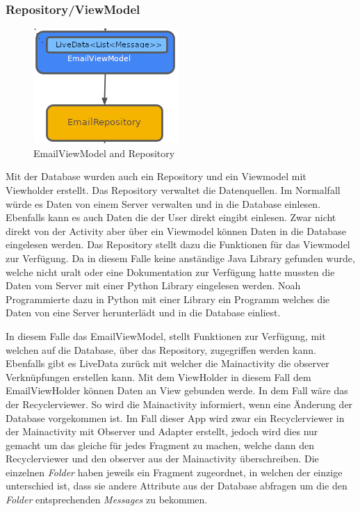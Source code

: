 \documentclass[a4paper,11pt]{article}
\begin{document}
\subsubsection{Repository/ViewModel}

\begingroup
\setlength{\intextsep}{1pt}
\setlength{\columnsep}{4pt}

\begin{figure}
    \centering
    \includegraphics[width=.4\textwidth]{media/ViewModelRepository.png}
    \caption{EmailViewModel and Repository
    \cite{appStructurePicture}}
\end{figure}

Mit der Database wurden auch ein Repository und ein Viewmodel mit Viewholder erstellt. 
Das Repository verwaltet die Datenquellen. Im Normalfall würde es Daten von einem Server verwalten und in die Database einlesen. Ebenfalls kann
es auch Daten die der User direkt eingibt einlesen. Zwar nicht direkt von der Activity aber über ein Viewmodel können Daten in die Database eingelesen werden. Das Repository 
stellt dazu die Funktionen für das Viewmodel zur Verfügung. 
Da in diesem Falle keine anständige Java Library gefunden wurde, welche nicht uralt oder eine Dokumentation zur Verfügung hatte mussten die Daten vom Server mit einer 
Python Library eingelesen werden. Noah Programmierte dazu in Python mit einer Library ein Programm welches die Daten von eine Server herunterlädt und in die Database einliest. 

In diesem Falle das EmailViewModel, stellt Funktionen zur Verfügung, mit welchen auf die Database, über das Repository, zugegriffen werden kann. Ebenfalls gibt es LiveData zurück 
mit welcher die Mainactivity die observer Verknüpfungen erstellen kann. Mit dem ViewHolder in diesem Fall dem EmailViewHolder können Daten an View gebunden werde. In dem Fall wäre das 
der Recyclerviewer.
So wird die Mainactivity informiert, wenn eine Änderung der Database vorgekommen ist. Im Fall dieser App wird zwar 
ein Recyclerviewer in der Mainactivity mit Observer und Adapter erstellt, jedoch wird dies nur gemacht um das gleiche für jedes Fragment zu machen, welche dann den Recyclerviewer und den 
observer aus der Mainactivity überschreiben. Die einzelnen \textit{Folder} haben jeweils ein Fragment zugeordnet, in welchen der einzige unterschied ist, dass sie andere 
Attribute aus der Database abfragen um die den \textit{Folder} entsprechenden \textit{Messages} zu bekommen. 
\end{document}
